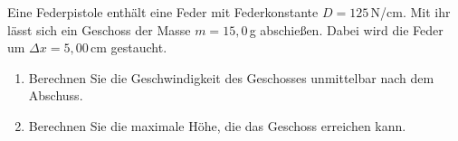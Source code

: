 \begin{ExerciseBlock}
Eine Federpistole enthält eine Feder mit Federkonstante $D = 125\,$N/cm. Mit ihr lässt sich ein Geschoss der Masse $m=15,0\,$g abschießen. Dabei wird die Feder um $\Delta x=5,00\,$cm gestaucht.

\begin{enumerate}
	\item Berechnen Sie die Geschwindigkeit des Geschosses unmittelbar nach dem Abschuss.

	\item Berechnen Sie die maximale Höhe, die das Geschoss erreichen kann.

\end{enumerate}
\end{ExerciseBlock}
